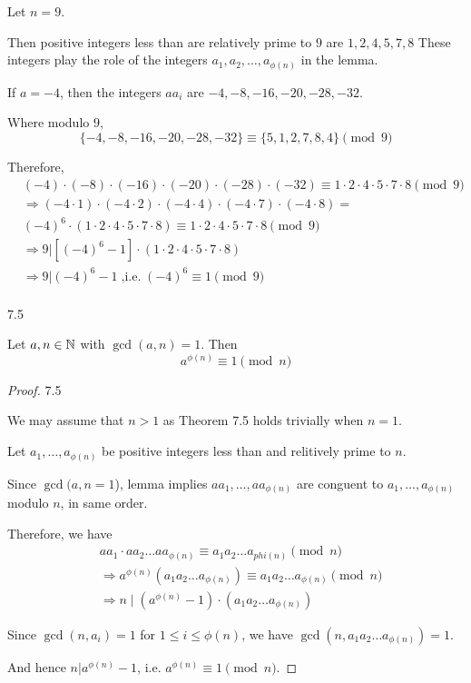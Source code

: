 \begin{eg}
    Let $n = 9$. 
    
    Then positive integers less than are relatively prime to $9$ are $1, 2, 4, 5, 7, 8$
    These integers play the role of the integers $a_1, a_2, \dots, a_{\phi(n)}$ in the lemma.

    If $a = -4$, then the integers $aa_i$ are $-4, -8, -16, -20, -28, -32$.

    Where modulo $9$, 
    \[  
        \{-4, -8, -16, -20, -28, -32\} \equiv \{5, 1, 2, 7, 8, 4\} \pmod 9
    \]

    Therefore,
    \[
        \begin{aligned}
            &(-4)\cdot(-8)\cdot(-16)\cdot(-20)\cdot(-28)\cdot (-32) \equiv 1\cdot2\cdot4\cdot5\cdot7\cdot8 \pmod 9 \\
            &\Rightarrow (-4\cdot1)\cdot(-4\cdot2)\cdot(-4\cdot4)\cdot(-4\cdot7)\cdot(-4\cdot8) = \\ 
            &(-4)^6\cdot(1\cdot2\cdot4\cdot5\cdot7\cdot8) \equiv 1\cdot2\cdot4\cdot5\cdot7\cdot8 \pmod 9 \\
            &\Rightarrow 9 | [(-4)^6 - 1]\cdot (1\cdot2\cdot4\cdot5\cdot7\cdot8) \\
            &\Rightarrow 9 | (-4)^6 - 1 \; \text{,i.e.} \; (-4)^6 \equiv 1 \pmod 9 \\
        \end{aligned}
    \]
\end{eg}

\begin{theorem} 7.5

    Let $a, n \in \mathbb{N}$ with $\gcd(a, n) = 1$.
    Then
    \[
        a^{\phi(n)} \equiv 1 \pmod n
    \]
\end{theorem}
\begin{proof} 7.5
    
    We may assume that $n > 1$ as Theorem 7.5 holds trivially when $n = 1$.

    Let $a_1, \dots, a_{\phi(n)}$ be positive integers less than and relitively prime to $n$.

    Since $\gcd(a, n = 1$), lemma implies $aa_1, \dots, aa_{\phi(n)}$ are conguent to
    $a_1, \dots, a_{\phi(n)}$ modulo $n$, in same order.

    Therefore, we have
    \[
        \begin{aligned}
            &aa_1 \cdot aa_2 \dots aa_{\phi(n)} \equiv a_1a_2\dots a_{phi(n)} \pmod n \\
            &\Rightarrow a^{\phi(n)}(a_1a_2\dots a_{\phi(n)}) \equiv a_1a_2\dots a_{\phi(n)} \pmod n \\
            &\Rightarrow n \;|\; (a^{\phi(n)} - 1)\cdot(a_1a_2\dots a_{\phi(n)})
        \end{aligned}
    \]

    Since $\gcd(n, a_i) = 1$ for $1 \leq i \leq \phi(n)$, we have $\gcd(n, a_1a_2\dots a_{\phi(n)}) = 1$.

    And hence $n | a^{\phi(n)} - 1$, i.e. $a^{\phi(n)} \equiv 1 \pmod n$.


\end{proof}
